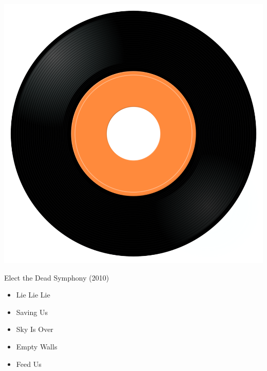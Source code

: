 \begin{minipage}[t]{0.25\textwidth}
\captionsetup{type=figure}
\includegraphics[width=\textwidth]{Images/cover.png}
\caption*{Elect the Dead Symphony (2010)}
\end{minipage}
\begin{minipage}[t]{0.25\textwidth}\vspace{0pt}
\begin{itemize}[nosep,leftmargin=1em,labelwidth=*,align=left]
	\setlength{\itemsep}{0pt}
	\item Lie Lie Lie
	\item Saving Us
	\item Sky Is Over
	\item Empty Walls
	\item Feed Us
\end{itemize}
\end{minipage}
